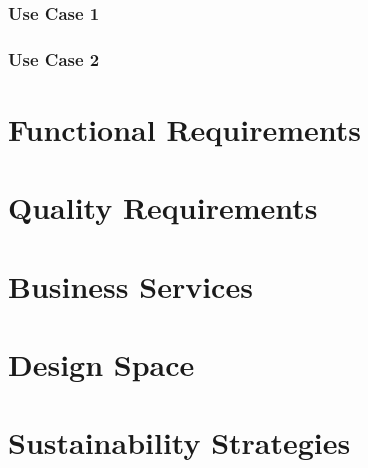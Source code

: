 \documentclass[11pt]{article}
\begin{document}
\subsubsection{Use Case 1}
\label{sec:org3bec0e6}
\subsubsection{Use Case 2}
\label{sec:org0362ea8}
\section{Functional Requirements}
\label{sec:org4cd644b}
\section{Quality Requirements}
\label{sec:orgd749fb0}
\section{Business Services}
\label{sec:org75e9ecb}
\section{Design Space}
\label{sec:org4741617}
\section{Sustainability Strategies}
\label{sec:org8094603}
\end{document}
